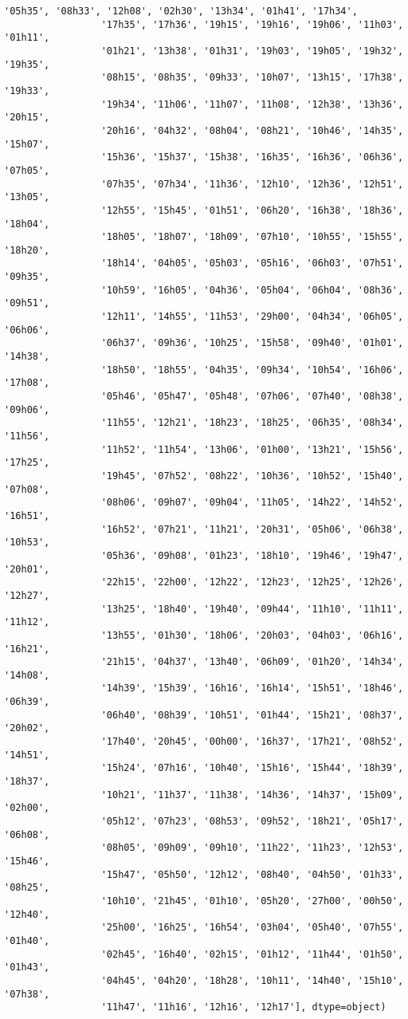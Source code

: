 \documentclass[11pt]{article}
\begin{document}
\begin{Verbatim}[commandchars=\\\{\}]
                 '05h35', '08h33', '12h08', '02h30', '13h34', '01h41', '17h34',
                 '17h35', '17h36', '19h15', '19h16', '19h06', '11h03', '01h11',
                 '01h21', '13h38', '01h31', '19h03', '19h05', '19h32', '19h35',
                 '08h15', '08h35', '09h33', '10h07', '13h15', '17h38', '19h33',
                 '19h34', '11h06', '11h07', '11h08', '12h38', '13h36', '20h15',
                 '20h16', '04h32', '08h04', '08h21', '10h46', '14h35', '15h07',
                 '15h36', '15h37', '15h38', '16h35', '16h36', '06h36', '07h05',
                 '07h35', '07h34', '11h36', '12h10', '12h36', '12h51', '13h05',
                 '12h55', '15h45', '01h51', '06h20', '16h38', '18h36', '18h04',
                 '18h05', '18h07', '18h09', '07h10', '10h55', '15h55', '18h20',
                 '18h14', '04h05', '05h03', '05h16', '06h03', '07h51', '09h35',
                 '10h59', '16h05', '04h36', '05h04', '06h04', '08h36', '09h51',
                 '12h11', '14h55', '11h53', '29h00', '04h34', '06h05', '06h06',
                 '06h37', '09h36', '10h25', '15h58', '09h40', '01h01', '14h38',
                 '18h50', '18h55', '04h35', '09h34', '10h54', '16h06', '17h08',
                 '05h46', '05h47', '05h48', '07h06', '07h40', '08h38', '09h06',
                 '11h55', '12h21', '18h23', '18h25', '06h35', '08h34', '11h56',
                 '11h52', '11h54', '13h06', '01h00', '13h21', '15h56', '17h25',
                 '19h45', '07h52', '08h22', '10h36', '10h52', '15h40', '07h08',
                 '08h06', '09h07', '09h04', '11h05', '14h22', '14h52', '16h51',
                 '16h52', '07h21', '11h21', '20h31', '05h06', '06h38', '10h53',
                 '05h36', '09h08', '01h23', '18h10', '19h46', '19h47', '20h01',
                 '22h15', '22h00', '12h22', '12h23', '12h25', '12h26', '12h27',
                 '13h25', '18h40', '19h40', '09h44', '11h10', '11h11', '11h12',
                 '13h55', '01h30', '18h06', '20h03', '04h03', '06h16', '16h21',
                 '21h15', '04h37', '13h40', '06h09', '01h20', '14h34', '14h08',
                 '14h39', '15h39', '16h16', '16h14', '15h51', '18h46', '06h39',
                 '06h40', '08h39', '10h51', '01h44', '15h21', '08h37', '20h02',
                 '17h40', '20h45', '00h00', '16h37', '17h21', '08h52', '14h51',
                 '15h24', '07h16', '10h40', '15h16', '15h44', '18h39', '18h37',
                 '10h21', '11h37', '11h38', '14h36', '14h37', '15h09', '02h00',
                 '05h12', '07h23', '08h53', '09h52', '18h21', '05h17', '06h08',
                 '08h05', '09h09', '09h10', '11h22', '11h23', '12h53', '15h46',
                 '15h47', '05h50', '12h12', '08h40', '04h50', '01h33', '08h25',
                 '10h10', '21h45', '01h10', '05h20', '27h00', '00h50', '12h40',
                 '25h00', '16h25', '16h54', '03h04', '05h40', '07h55', '01h40',
                 '02h45', '16h40', '02h15', '01h12', '11h44', '01h50', '01h43',
                 '04h45', '04h20', '18h28', '10h11', '14h40', '15h10', '07h38',
                 '11h47', '11h16', '12h16', '12h17'], dtype=object)
\end{Verbatim}
            
\end{document}
